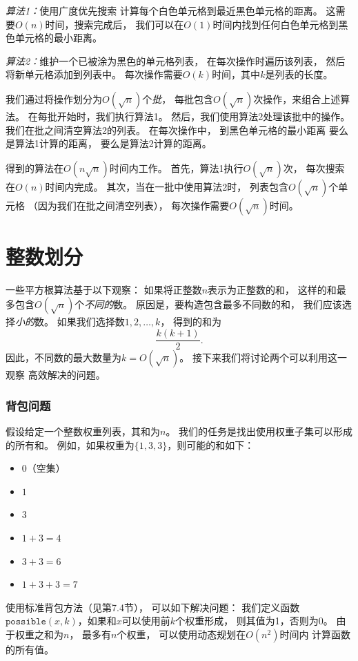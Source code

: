 \emph{算法1：}使用广度优先搜索
计算每个白色单元格到最近黑色单元格的距离。
这需要$O(n)$时间，搜索完成后，
我们可以在$O(1)$时间内找到任何白色单元格到黑色单元格的最小距离。

\emph{算法2：}维护一个已被涂为黑色的单元格列表，
在每次操作时遍历该列表，
然后将新单元格添加到列表中。
每次操作需要$O(k)$时间，其中$k$是列表的长度。

我们通过将操作划分为$O(\sqrt n)$个\emph{批}，
每批包含$O(\sqrt n)$次操作，来组合上述算法。
在每批开始时，我们执行算法1。
然后，我们使用算法2处理该批中的操作。
我们在批之间清空算法2的列表。
在每次操作中，
到黑色单元格的最小距离
要么是算法1计算的距离，
要么是算法2计算的距离。

得到的算法在$O(n \sqrt n)$时间内工作。
首先，算法1执行$O(\sqrt n)$次，
每次搜索在$O(n)$时间内完成。
其次，当在一批中使用算法2时，
列表包含$O(\sqrt n)$个单元格
（因为我们在批之间清空列表），
每次操作需要$O(\sqrt n)$时间。

\section{整数划分}

一些平方根算法基于以下观察：
如果将正整数$n$表示为正整数的和，
这样的和最多包含$O(\sqrt n)$个\emph{不同的}数。
原因是，要构造包含最多不同数的和，
我们应该选择\emph{小的}数。
如果我们选择数$1,2,\ldots,k$，
得到的和为
\[\frac{k(k+1)}{2}.\]
因此，不同数的最大数量为$k = O(\sqrt n)$。
接下来我们将讨论两个可以利用这一观察
高效解决的问题。

\subsubsection{背包问题}

假设给定一个整数权重列表，其和为$n$。
我们的任务是找出使用权重子集可以形成的所有和。
例如，如果权重为$\{1,3,3\}$，则可能的和如下：

\begin{itemize}[noitemsep]
\item $0$（空集）
\item $1$
\item $3$
\item $1+3=4$
\item $3+3=6$
\item $1+3+3=7$
\end{itemize}

使用标准背包方法（见第7.4节），
可以如下解决问题：
我们定义函数$\texttt{possible}(x,k)$，如果和$x$可以使用前$k$个权重形成，
则其值为1，否则为0。
由于权重之和为$n$，
最多有$n$个权重，
可以使用动态规划在$O(n^2)$时间内
计算函数的所有值。

